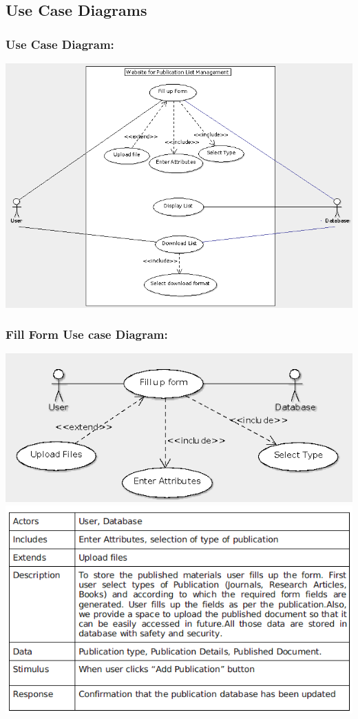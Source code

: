 \documentclass[12pt]{extarticle}
\begin{document}
	\subsection{Use Case Diagrams}
	
		\subsubsection{Use Case Diagram:}
			\includegraphics[scale=0.5]{UCD}
		\subsubsection{Fill Form Use case Diagram:}
			\includegraphics[scale=0.6]{uc/ffuc_diag}
			\\
			\includegraphics[scale=0.7]{uc/fillformusecase}
\end{document}
